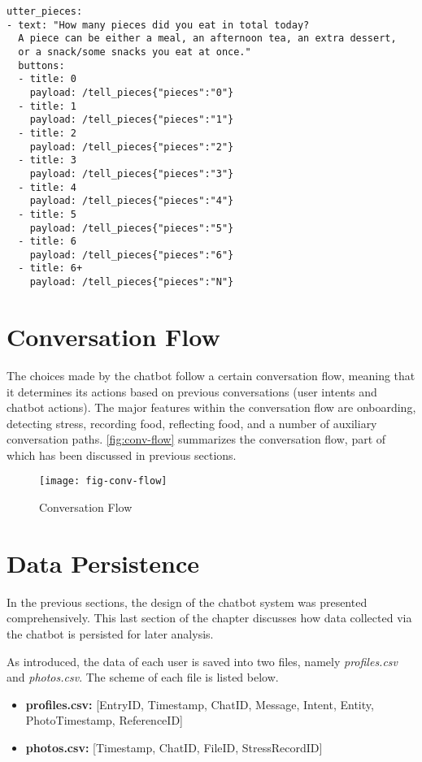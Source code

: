 \begin{lstlisting}
utter_pieces:
- text: "How many pieces did you eat in total today?
  A piece can be either a meal, an afternoon tea, an extra dessert,
  or a snack/some snacks you eat at once."
  buttons:
  - title: 0
    payload: /tell_pieces{"pieces":"0"}
  - title: 1
    payload: /tell_pieces{"pieces":"1"}
  - title: 2
    payload: /tell_pieces{"pieces":"2"}
  - title: 3
    payload: /tell_pieces{"pieces":"3"}
  - title: 4
    payload: /tell_pieces{"pieces":"4"}
  - title: 5
    payload: /tell_pieces{"pieces":"5"}
  - title: 6
    payload: /tell_pieces{"pieces":"6"}
  - title: 6+
    payload: /tell_pieces{"pieces":"N"}
\end{lstlisting}

\section{Conversation Flow} \label{flow}
The choices made by the chatbot follow a certain conversation flow, meaning that it determines its actions based on previous conversations (user intents and chatbot actions). The major features within the conversation flow are onboarding, detecting stress, recording food, reflecting food, and a number of auxiliary conversation paths. \autoref{fig:conv-flow} summarizes the conversation flow, part of which has been discussed in previous sections.

\begin{figure}[ht]
  \centering
  \texttt{[image: fig-conv-flow]}
  \caption{Conversation Flow}
  \label{fig:conv-flow}
\end{figure}

\section{Data Persistence} \label{data_persis}
In the previous sections, the design of the chatbot system was presented comprehensively. This last section of the chapter discusses how data collected via the chatbot is persisted for later analysis.

As introduced, the data of each user is saved into two files, namely \emph{profiles.csv} and \emph{photos.csv}. The scheme of each file is listed below.

\begin{itemize}
  \item \textbf{profiles.csv:} [EntryID, Timestamp, ChatID, Message, Intent, Entity, PhotoTimestamp, ReferenceID]
  \item \textbf{photos.csv:} [Timestamp, ChatID, FileID, StressRecordID]
\end{itemize}


